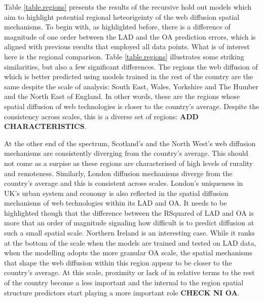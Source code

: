 \documentclass[
  authoryear,
  preprint,
  3p]{elsarticle}
\begin{document}
Table \ref{table.regions} presents the results of the recursive hold out
models which aim to highlight potential regional heteorigeinty of the
web diffusion spatial mechanisms. To begin with, as highlighted before,
there is a difference of magnitude of one order between the LAD and the
OA prediction errors, which is aligned with previous results that
employed all data points. What is of interest here is the regional
comparison. Table \ref{table.regions} illustrates some striking
similarities, but also a few significant differences. The regions the
web diffusion of which is better predicted using models trained in the
rest of the country are the same despite the scale of analysis: South
East, Wales, Yorkshire and The Humber and the North East of England. In
other words, these are the regions whose spatial diffusion of web
technologies is closer to the country's average. Despite the consistency
across scales, this is a diverse set of regions: \textbf{ADD
CHARACTERISTICS}.

At the other end of the spectrum, Scotland's and the North West's web
diffusion mechanisms are consistently diverging from the country's
average. This should not come as a surpise as these regions are
characterised of high levels of rurality and remoteness. Similarly,
London diffusion mechanisms diverge from the country's average and this
is consistent across scales. London's uniqueness in UK's urban system
and economy is also reflected in the spatial diffusion mechanisms of web
technologies within its LAD and OA. It needs to be highlighted though
that the difference between the RSquared of LAD and OA is more that an
order of magnitude signaling how difficult is to predict diffusion at
such a small spatial scale. Northern Ireland is an interesting case.
While it ranks at the bottom of the scale when the models are trained
and tested on LAD data, when the modelling adopts the more granular OA
scale, the spatial mechanisms that shape the web diffusion within this
region appear to be closer to the country's average. At this scale,
proximity or lack of in relative terms to the rest of the country become
a less important and the internal to the region spatial structure
predictors start playing a more important role \textbf{CHECK NI OA}.
\end{document}
